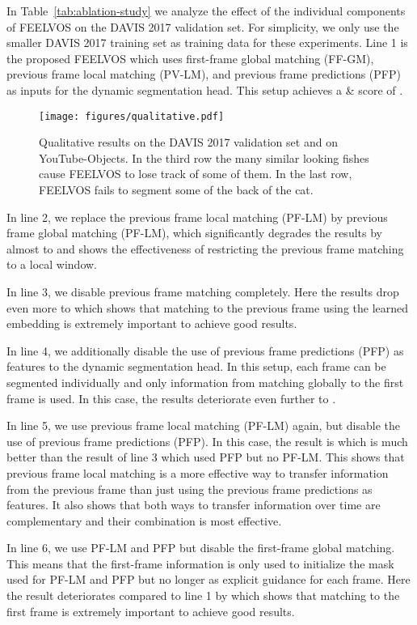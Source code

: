 \documentclass[10pt,twocolumn,letterpaper]{article}
\newcommand{\PAR}[1]{\vskip1pt \noindent {\bf #1~}}
\begin{document}
\PAR{Ablation Study.} In Table~\ref{tab:ablation-study} we analyze the effect of the individual components of FEELVOS on the DAVIS 2017 validation set. For simplicity, we only use the smaller DAVIS 2017 training set as training data for these experiments.
Line 1 is the proposed FEELVOS which uses first-frame global matching (FF-GM), previous frame local matching (PV-LM), and previous frame predictions (PFP) as inputs for the dynamic segmentation head. This setup achieves a \& score of .

\begin{figure*}[t]
\texttt{[image: figures/qualitative.pdf]}
\caption{\label{fig:qualitative}Qualitative results on the DAVIS 2017 validation set and on YouTube-Objects. In the third row the many similar looking fishes cause FEELVOS to lose track of some of them. In the last row, FEELVOS fails to segment some of the back of the cat.
}
\end{figure*}

In line 2, we replace the previous frame local matching (PF-LM) by previous frame global matching (PF-LM), which significantly degrades the results by almost  to  and shows the effectiveness of restricting the previous frame matching to a local window.

In line 3, we disable previous frame matching completely. Here the results drop even more to  which shows that matching to the previous frame using the learned embedding is extremely important to achieve good results.

In line 4, we additionally disable the use of previous frame predictions (PFP) as features to the dynamic segmentation head. In this setup, each frame can be segmented individually and only information from matching globally to the first frame is used. In this case, the results deteriorate even further to .

In line 5, we use previous frame local matching (PF-LM) again, but disable the use of previous frame predictions (PFP). In this case, the result is  which is much better than the result of line 3 which used PFP but no PF-LM. This shows that previous frame local matching is a more effective way to transfer information from the previous frame than just using the previous frame predictions as features. It also shows that both ways to transfer information over time are complementary and their combination is most effective.

In line 6, we use PF-LM and PFP but disable the first-frame global matching. This means that the first-frame information is only used to initialize the mask used for PF-LM and PFP but no longer as explicit guidance for each frame. Here the result deteriorates compared to line 1 by  which shows that matching to the first frame is extremely important to achieve good results.
\end{document}
